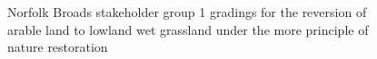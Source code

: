 \documentclass[
  12pt,
  letterpaper,
  DIV=11,
  numbers=noendperiod]{scrartcl}
\begin{document}
\begin{figure}[H]


\caption{\label{fig-BroadsArMoreG1}Norfolk Broads stakeholder group 1
gradings for the reversion of arable land to lowland wet grassland under
the more principle of nature restoration}

\end{figure}%
\end{document}
